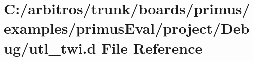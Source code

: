 \hypertarget{boards_2primus_2examples_2primus_eval_2project_2_debug_2utl__twi_8d}{\section{C\-:/arbitros/trunk/boards/primus/examples/primus\-Eval/project/\-Debug/utl\-\_\-twi.d File Reference}
\label{boards_2primus_2examples_2primus_eval_2project_2_debug_2utl__twi_8d}
}
